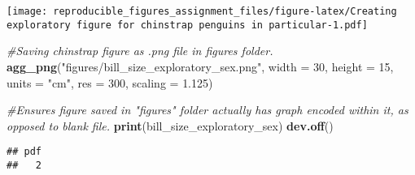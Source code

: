 \documentclass[
]{article}
\newenvironment{Shaded}{\begin{snugshade}}{\end{snugshade}}
\newcommand{\AttributeTok}[1]{\textcolor[rgb]{0.13,0.29,0.53}{#1}}
\newcommand{\CommentTok}[1]{\textcolor[rgb]{0.56,0.35,0.01}{\textit{#1}}}
\newcommand{\DecValTok}[1]{\textcolor[rgb]{0.00,0.00,0.81}{#1}}
\newcommand{\FloatTok}[1]{\textcolor[rgb]{0.00,0.00,0.81}{#1}}
\newcommand{\FunctionTok}[1]{\textcolor[rgb]{0.13,0.29,0.53}{\textbf{#1}}}
\newcommand{\NormalTok}[1]{#1}
\newcommand{\StringTok}[1]{\textcolor[rgb]{0.31,0.60,0.02}{#1}}
\begin{document}
\texttt{[image: reproducible\_figures\_assignment\_files/figure-latex/Creating exploratory figure for chinstrap penguins in particular-1.pdf]}

\begin{Shaded}
\begin{Highlighting}[]
\CommentTok{\#Saving chinstrap figure as .png file in figures folder.}
\FunctionTok{agg\_png}\NormalTok{(}\StringTok{"figures/bill\_size\_exploratory\_sex.png"}\NormalTok{, }
        \AttributeTok{width =} \DecValTok{30}\NormalTok{,}
        \AttributeTok{height =} \DecValTok{15}\NormalTok{,}
        \AttributeTok{units =} \StringTok{"cm"}\NormalTok{,}
        \AttributeTok{res =} \DecValTok{300}\NormalTok{,}
        \AttributeTok{scaling =} \FloatTok{1.125}\NormalTok{)}

\CommentTok{\#Ensures figure saved in "figures" folder actually has graph encoded within it, as opposed to blank file.}
\FunctionTok{print}\NormalTok{(bill\_size\_exploratory\_sex)}
\FunctionTok{dev.off}\NormalTok{()}
\end{Highlighting}
\end{Shaded}

\begin{verbatim}
## pdf 
##   2
\end{verbatim}
\end{document}
